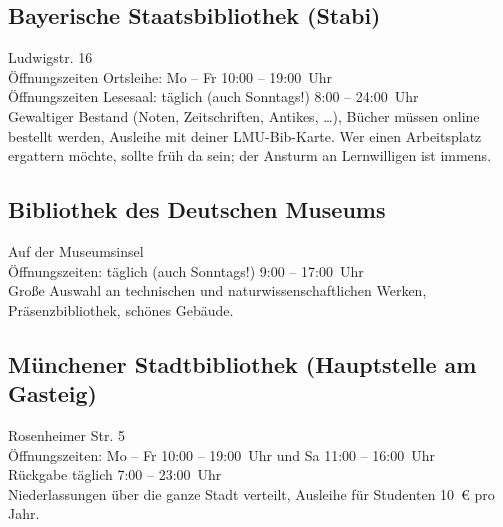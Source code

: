 \begin{urlList}
\end{urlList}

\subsection*{Bayerische Staatsbibliothek (Stabi)}
Ludwigstr. 16\\
Öffnungszeiten Ortsleihe: Mo -- Fr 10:00 -- 19:00~Uhr\\
Öffnungszeiten Lesesaal: täglich (auch Sonntags!) 8:00 -- 24:00~Uhr\\
Gewaltiger Bestand (Noten, Zeitschriften, Antikes, \ldots), Bücher
müssen online bestellt werden, Ausleihe mit deiner LMU-Bib-Karte. Wer
einen Arbeitsplatz ergattern möchte, sollte früh da sein; der
Ansturm an Lernwilligen ist immens.

\begin{urlList}
\end{urlList}

\subsection*{Bibliothek des Deutschen Museums}
Auf der Museumsinsel\\
Öffnungszeiten: täglich (auch Sonntags!) 9:00 -- 17:00~Uhr\\
Große Auswahl an technischen und naturwissenschaftlichen Werken, Präsenzbibliothek, schönes Gebäude.

\begin{urlList}
\end{urlList}

\subsection*{Münchener Stadtbibliothek (Hauptstelle am Gasteig)}
Rosenheimer Str. 5\\
Öffnungszeiten: Mo -- Fr 10:00 -- 19:00~Uhr und Sa 11:00 -- 16:00~Uhr\\
Rückgabe täglich 7:00 -- 23:00~Uhr\\
Niederlassungen über die ganze Stadt verteilt, Ausleihe für Studenten 10~€ pro Jahr.

\begin{urlList}
\end{urlList}
